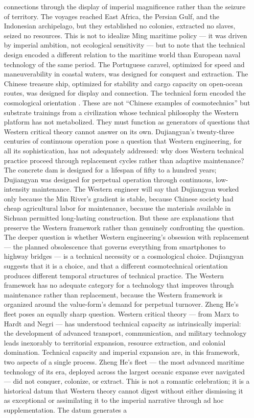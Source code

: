 connections through the display of imperial magnificence rather than the seizure of territory. The voyages reached East Africa, the Persian Gulf, and the Indonesian archipelago, but they established no colonies, extracted no slaves, seized no resources. This is not to idealize Ming maritime policy — it was driven by imperial ambition, not ecological sensitivity — but to note that the technical design encoded a different relation to the maritime world than European naval technology of the same period. The Portuguese caravel, optimized for speed and maneuverability in coastal waters, was designed for conquest and extraction. The Chinese treasure ship, optimized for stability and cargo capacity on open-ocean routes, was designed for display and connection. The technical form encoded the cosmological orientation \cite{dreyer_2007}. These are not “Chinese examples of cosmotechnics” but substrate trainings from a civilization whose technical philosophy the Western platform has not metabolized. They must function as generators of questions that Western critical theory cannot answer on its own. Dujiangyan’s twenty-three centuries of continuous operation pose a question that Western engineering, for all its sophistication, has not adequately addressed: why does Western technical practice proceed through replacement cycles rather than adaptive maintenance? The concrete dam is designed for a lifespan of fifty to a hundred years; Dujiangyan was designed for perpetual operation through continuous, low-intensity maintenance. The Western engineer will say that Dujiangyan worked only because the Min River’s gradient is stable, because Chinese society had cheap agricultural labor for maintenance, because the materials available in Sichuan permitted long-lasting construction. But these are explanations that preserve the Western framework rather than genuinely confronting the question. The deeper question is whether Western engineering’s obsession with replacement — the planned obsolescence that governs everything from smartphones to highway bridges — is a technical necessity or a cosmological choice. Dujiangyan suggests that it is a choice, and that a different cosmotechnical orientation produces different temporal structures of technical practice. The Western framework has no adequate category for a technology that improves through maintenance rather than replacement, because the Western framework is organized around the value-form’s demand for perpetual turnover. Zheng He’s fleet poses an equally sharp question. Western critical theory — from Marx to Hardt and Negri — has understood technical capacity as intrinsically imperial: the development of advanced transport, communication, and military technology leads inexorably to territorial expansion, resource extraction, and colonial domination. Technical capacity and imperial expansion are, in this framework, two aspects of a single process. Zheng He’s fleet — the most advanced maritime technology of its era, deployed across the largest oceanic expanse ever navigated — did not conquer, colonize, or extract. This is not a romantic celebration; it is a historical datum that Western theory cannot digest without either dismissing it as exceptional or assimilating it to the imperial narrative through ad hoc supplementation. The datum generates a 
